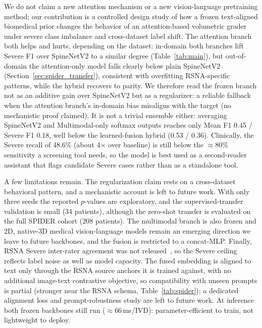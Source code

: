 \documentclass[runningheads]{llncs}
\begin{document}
We do not claim a new attention mechanism or a new vision-language pretraining method; our contribution is a controlled design study of how a frozen text-aligned biomedical prior changes the behavior of an attention-based volumetric grader under severe class imbalance and cross-dataset label shift. The attention branch both helps and hurts, depending on the dataset: in-domain both branches lift Severe F1 over SpineNetV2 to a similar degree (Table~\ref{tab:main}), but out-of-domain the attention-only model falls clearly below plain SpineNetV2 (Section~\ref{sec:spider_transfer}), consistent with overfitting RSNA-specific patterns, while the hybrid recovers to parity. We therefore read the frozen branch not as an additive gain over SpineNetV2 but as a regularizer: a reliable fallback when the attention branch's in-domain bias misaligns with the target (no mechanistic proof claimed). It is not a trivial ensemble either: averaging SpineNetV2 and Multimodal-only softmax outputs reaches only Mean F1 0.45 / Severe F1 0.18, well below the learned-fusion hybrid (0.53 / 0.36). Clinically, the Severe recall of 48.6\% (about 4$\times$ over baseline) is still below the $\approx$80\% sensitivity a screening tool needs, so the model is best used as a second-reader assistant that flags candidate Severe cases rather than as a standalone tool.

A few limitations remain. The regularization claim rests on a cross-dataset behavioral pattern, and a mechanistic account is left to future work. With only three seeds the reported $p$-values are exploratory, and the supervised-transfer validation is small (34 patients), although the zero-shot transfer is evaluated on the full SPIDER cohort (208 patients). The multimodal branch is also frozen and 2D, native-3D medical vision-language models remain an emerging direction we leave to future backbones, and the fusion is restricted to a concat-MLP. Finally, RSNA Severe inter-rater agreement was not released~\cite{kaggle2024}, so the Severe ceiling reflects label noise as well as model capacity. The fused embedding is aligned to text only through the RSNA source anchors it is trained against, with no additional image-text contrastive objective, so compatibility with unseen prompts is partial (stronger near the RSNA schema, Table~\ref{tab:spider}); a dedicated alignment loss and prompt-robustness study are left to future work. At inference both frozen backbones still run ($\approx$66\,ms/IVD): parameter-efficient to train, not lightweight to deploy.

\end{document}
